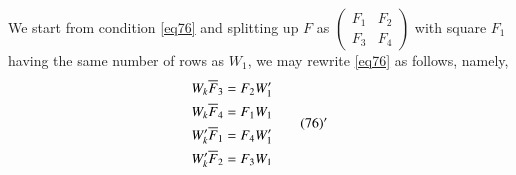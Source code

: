 We start from condition \eqref{eq76} and splitting up $F$ as
$\left(\begin{smallmatrix} F_{1} & F_{2}\\ F_{3} & F_{4}
\end{smallmatrix}\right)$ with square $F_{1}$ having the same number
of rows as $W_{1}$, we may rewrite \eqref{eq76} as follows, namely,
\begin{equation*}
\begin{split}
W_{k}\overline{F}_{3} &= F_{2}W'_{1}\\
W_{k}\overline{F}_{4} &= F_{1}W_{1}\\
W'_{k}\overline{F}_{1} &= F_{4}W'_{1}\\
W'_{k}\overline{F}_{2} &= F_{3}W_{1}
\end{split}\tag*{$(76)'$}
\end{equation*}

